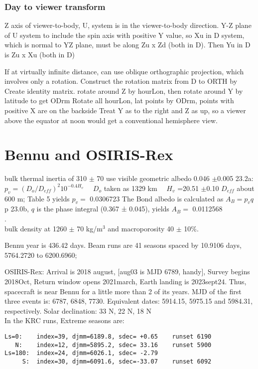 \documentclass{article}
\begin{document}
\subsubsection{Day to viewer transform}
Z axis of viewer-to-body, U, system is in the viewer-to-body direction. 
Y-Z plane of U system to include the spin axis with positive Y value, so Xu in D system, which is normal to YZ plane, must be along Zu x Zd (both in D). Then Yu in D is Zu x Xu (both in D)

If at virtually infinite distance, can use oblique orthographic projection, which involves only a rotation.  Construct the rotation matrix from D to ORTH by 
\qi Create identity matrix. rotate around Z by hourLon, then rotate around Y by latitude to get ODrm
\qi Rotate all hourLon, lat points by ODrm, points with positive X are on the backside 
\qi Treat Y as to the right and Z as up, so a viewer above the equator at noon would get a conventional hemisphere view.


\section{Bennu and OSIRIS-Rex}  %

\qi bulk thermal inertia of 310 $\pm$ 70 \quti
\qi use visible geometric albedo  0.046  $\pm$0.005
\qii 23.2a: $p_v = ( D_o/ D_{eff})^2 10^{-0.4H_v}$  \ \ $D_o$ taken as 1329 km \ \ $H_v$ =20.51 $\pm$0.10
\qii $ D_{eff}$ about 600 m; Table 5
\qii yields $p_v=$ 0.0306723
\qi The Bond albedo is calculated as $A_B = p_v q$ 
\qii p 23.0b,  $q$ is the phase integral (0.367 ± 0.045),
\qii yields $A_B =$  0.0112568
\\ .
\\ 
\qi bulk density at 1260 $\pm$ 70 kg/m$^3$ and macroporosity 40 $\pm$ 10\%.

Bennu year is 436.42 days.  Beam runs are 41 seasons spaced by 10.9106 days,
5764.2720 to 6200.6960; 

\vspace{2.mm} OSIRIS-Rex: Arrival is 2018 august, [aug03 is MJD 6789, handy],
Survey begins 2018Oct, Return window opens 2021march, Earth landing is
2023sept24. Thus, spacecraft is near Bennu for a little more than 2 of its
years. MJD of the first three events is: 6787, 6848, 7730.
\qi Equivalent dates:  5914.15, 5975.15 and 5984.31, respectively.
\qi Solar declination: 33 N, 22 N, 18 N 
\\ In the KRC runs, Extreme seasons are:
\vspace{-3.mm} 
\begin{verbatim}
Ls=0:    index=39, djmm=6189.8, sdec= +0.65    runset 6190
   N:    index=12, djmm=5895.2, sdec= 33.16    runset 5900
Ls=180:  index=24, djmm=6026.1, sdec= -2.79 
     S:  index=30, djmm=6091.6, sdec=-33.07    runset 6092
\end{verbatim} 
\end{document}
